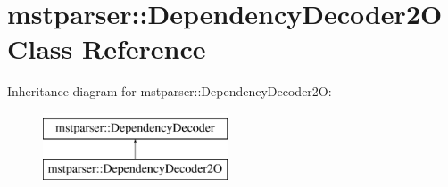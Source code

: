 \hypertarget{classmstparser_1_1DependencyDecoder2O}{
\section{mstparser::DependencyDecoder2O Class Reference}
\label{classmstparser_1_1DependencyDecoder2O}
}
Inheritance diagram for mstparser::DependencyDecoder2O:\begin{figure}[H]
\begin{center}
\leavevmode
\includegraphics[height=2cm]{classmstparser_1_1DependencyDecoder2O}
\end{center}
\end{figure}
